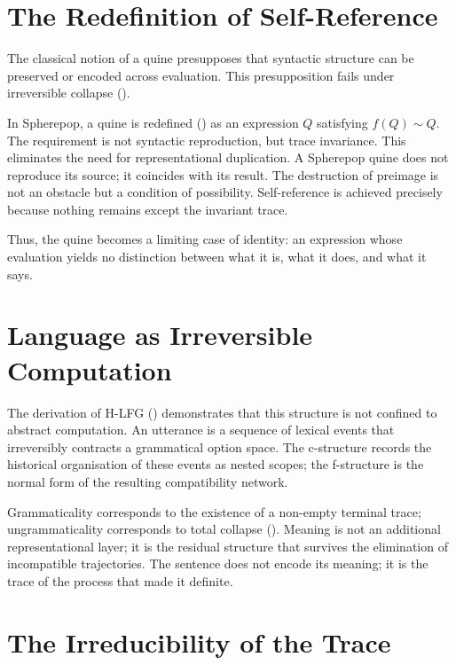 \documentclass[12pt, oneside]{amsbook}
\theoremstyle{plain}
\theoremstyle{definition}
\theoremstyle{remark}
\newcommand{\evalf}{f}
\newcommand{\tequiv}{\sim}
\begin{document}
\section{The Redefinition of Self-Reference}
\label{sec:concl:quine}

The classical notion of a quine presupposes that syntactic structure can be
preserved or encoded across evaluation. This presupposition fails under
irreversible collapse ().

In Spherepop, a quine is redefined () as an
expression $Q$ satisfying $\evalf(Q) \tequiv Q$. The requirement is not
syntactic reproduction, but trace invariance. This eliminates the need for
representational duplication. A Spherepop quine does not reproduce its source;
it coincides with its result. The destruction of preimage is not an obstacle
but a condition of possibility. Self-reference is achieved precisely because
nothing remains except the invariant trace.

Thus, the quine becomes a limiting case of identity: an expression whose
evaluation yields no distinction between what it is, what it does, and what
it says.

\section{Language as Irreversible Computation}
\label{sec:concl:language}

The derivation of H-LFG () demonstrates that this
structure is not confined to abstract computation. An utterance is a sequence
of lexical events that irreversibly contracts a grammatical option space. The
c-structure records the historical organisation of these events as nested
scopes; the f-structure is the normal form of the resulting compatibility
network.

Grammaticality corresponds to the existence of a non-empty terminal trace;
ungrammaticality corresponds to total collapse ().
Meaning is not an additional representational layer; it is the residual
structure that survives the elimination of incompatible trajectories. The
sentence does not encode its meaning; it is the trace of the process that made
it definite.

\section{The Irreducibility of the Trace}
\label{sec:concl:irreducibility}
\end{document}
